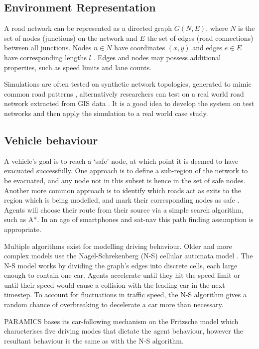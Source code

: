 \subsection{Environment Representation}
A road network can be represented as a directed graph $G (N,E)$, where $N$ is the set of nodes (junctions) on the network and $E$ the set of edges (road connections) between all junctions. Nodes $n \in N$ have coordinates $(x,y)$ and edges $e \in E$ have corresponding lengths $l$ \cite{Madireddy2011AnManagement}. Edges and nodes may possess additional properties, such as speed limits and lane counts.

Simulations are often tested on synthetic network topologies, generated to mimic common road patterns \cite{Zhang2009Agent-basedEvacuation}, alternatively researchers can test on a real world road network extracted from GIS data \cite{Chen2006Agent-BasedKeys}. It is a good idea to develop the system on test networks and then apply the simulation to a real world case study.

\subsection{Vehicle behaviour}
A vehicle's goal is to reach a `safe' node, at which point it is deemed to have evacuated successfully. One approach is to define a sub-region of the network to be evacuated, and any node not in this subset is hence in the set of safe nodes. \cite{Chen2008Agent-basedStrategies} Another more common approach is to identify which roads act as exits to the region which is being modelled, and mark their corresponding nodes as safe \cite{Madireddy2011AnManagement,Dawson2011AnManagement}.
Agents will choose their route from their source via a simple search algorithm, such as A*. In an age of smartphones and sat-nav this path finding assumption is appropriate.

Multiple algorithms exist for modelling driving behaviour. Older and more complex models use the Nagel-Schrekenberg (N-S) cellular automata model \cite{Nagel1992ATraffic,Nagel1998Two-laneApproach}. The N-S model works by dividing the graph's edges into discrete cells, each large enough to contain one car. Agents accelerate until they hit the speed limit or until their speed would cause a collision with the leading car in the next timestep. To account for fluctuations in traffic speed, the N-S algorithm gives a random chance of overbreaking to decelerate a car more than necessary.

PARAMICS bases its car-following mechanism on the Fritzsche model \cite{Fritzsche1994ASimulation} which characterises five driving modes that dictate the agent behaviour, however the resultant behaviour is the same as with the N-S algorithm. 


